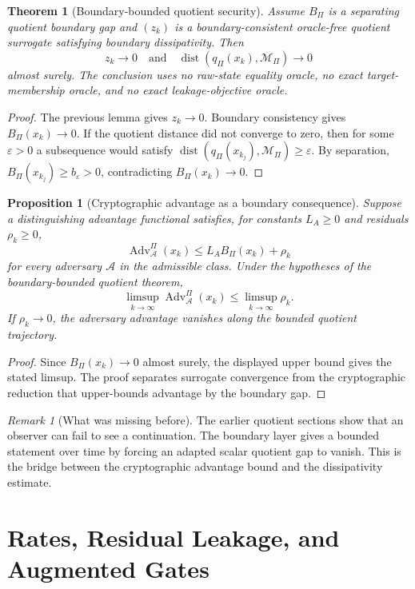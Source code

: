 \documentclass[11pt]{article}
\theoremstyle{definition}
\theoremstyle{plain}
\newtheorem{theorem}[definition]{Theorem}
\newtheorem{proposition}[definition]{Proposition}
\theoremstyle{remark}
\newtheorem{remark}[definition]{Remark}
\newcommand{\cA}{\mathcal{A}}
\newcommand{\cM}{\mathcal{M}}
\newcommand{\eps}{\varepsilon}
\begin{document}
\begin{theorem}[Boundary-bounded quotient security]
Assume $B_\Pi$ is a separating quotient boundary gap and $(z_k)$ is a boundary-consistent oracle-free quotient surrogate satisfying boundary dissipativity. Then
\[
    z_k\to0\quad\text{and}\quad \operatorname{dist}(q_\Pi(x_k),\cM_\Pi)\to0
\]
almost surely. The conclusion uses no raw-state equality oracle, no exact target-membership oracle, and no exact leakage-objective oracle.
\end{theorem}

\begin{proof}
The previous lemma gives $z_k\to0$. Boundary consistency gives $B_\Pi(x_k)\to0$. If the quotient distance did not converge to zero, then for some $\eps>0$ a subsequence would satisfy $\operatorname{dist}(q_\Pi(x_{k_j}),\cM_\Pi)\ge\eps$. By separation, $B_\Pi(x_{k_j})\ge b_\eps>0$, contradicting $B_\Pi(x_k)\to0$.
\end{proof}

\begin{proposition}[Cryptographic advantage as a boundary consequence]
Suppose a distinguishing advantage functional satisfies, for constants $L_A\ge0$ and residuals $\rho_k\ge0$,
\[
    \operatorname{Adv}^{\Pi}_{\cA}(x_k)\le L_A B_\Pi(x_k)+\rho_k
\]
for every adversary $\cA$ in the admissible class. Under the hypotheses of the boundary-bounded quotient theorem,
\[
    \limsup_{k\to\infty}\operatorname{Adv}^{\Pi}_{\cA}(x_k)\le \limsup_{k\to\infty}\rho_k.
\]
If $\rho_k\to0$, the adversary advantage vanishes along the bounded quotient trajectory.
\end{proposition}

\begin{proof}
Since $B_\Pi(x_k)\to0$ almost surely, the displayed upper bound gives the stated limsup. The proof separates surrogate convergence from the cryptographic reduction that upper-bounds advantage by the boundary gap.
\end{proof}

\begin{remark}[What was missing before]
The earlier quotient sections show that an observer can fail to see a continuation. The boundary layer gives a bounded statement over time by forcing an adapted scalar quotient gap to vanish. This is the bridge between the cryptographic advantage bound and the dissipativity estimate.
\end{remark}

\section{Rates, Residual Leakage, and Augmented Gates}
\end{document}
